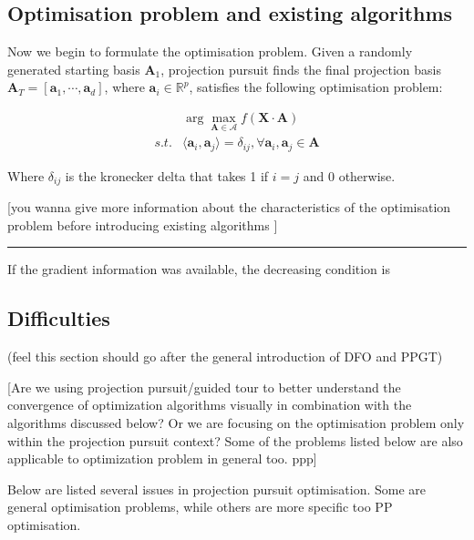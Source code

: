 \documentclass[12pt]{article}
\begin{document}
\hypertarget{tour-optim}{%
\subsection{Optimisation problem and existing
algorithms}\label{tour-optim}}

Now we begin to formulate the optimisation problem. Given a randomly
generated starting basis \(\mathbf{A}_1\), projection pursuit finds the
final projection basis
\(\mathbf{A}_T = [\mathbf{a}_1, \cdots, \mathbf{a}_d]\), where
\(\mathbf{a}_i \in \mathbb{R}^{p}\), satisfies the following
optimisation problem:

\begin{align}
&\arg \max_{\mathbf{A} \in \mathcal{A}} f(\mathbf{X} \cdot \mathbf{A}) \\
s.t. &  \langle \mathbf{a}_i, \mathbf{a}_j \rangle = \delta_{ij}, \forall \mathbf{a}_i, \mathbf{a}_j \in \mathbf{A}
\end{align}

Where \(\delta_{ij}\) is the kronecker delta that takes 1 if \(i = j\)
and 0 otherwise.

{[}you wanna give more information about the characteristics of the
optimisation problem before introducing existing algorithms {]}

\begin{center}\rule{0.5\linewidth}{0.5pt}\end{center}

If the gradient information was available, the decreasing condition is

\hypertarget{difficulties}{%
\subsection{Difficulties}\label{difficulties}}

(feel this section should go after the general introduction of DFO and
PPGT)

{[}Are we using projection pursuit/guided tour to better understand the
convergence of optimization algorithms visually in combination with the
algorithms discussed below? Or we are focusing on the optimisation
problem only within the projection pursuit context? Some of the problems
listed below are also applicable to optimization problem in general too.
ppp{]}

Below are listed several issues in projection pursuit optimisation. Some
are general optimisation problems, while others are more specific too PP
optimisation.
\end{document}
